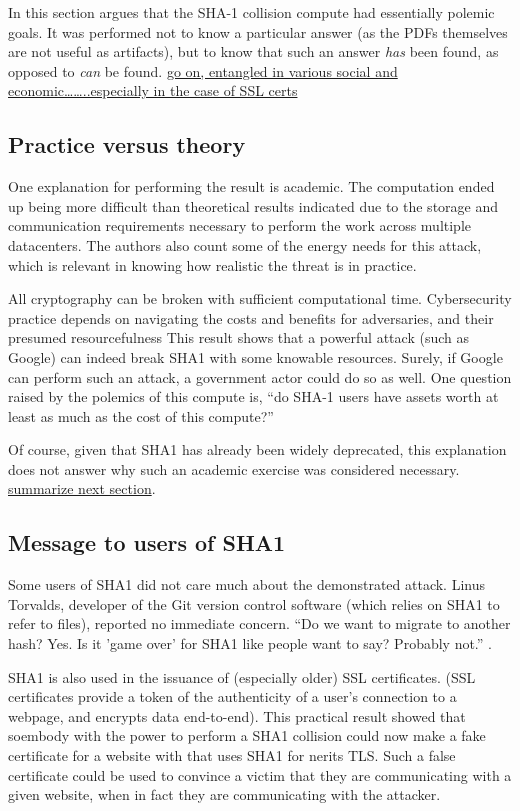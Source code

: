 \documentclass[sigconf]{acmart}
\begin{document}
In this section argues that
the SHA-1 collision compute had essentially polemic goals.
It was performed not to know a particular answer
(as the PDFs themselves are not useful as artifacts), 
but to know that such an answer \emph{has} been found,
as opposed to \emph{can} be found.
\uline{go on, entangled in various social and economic\ldots{}\ldots{}..especially in the case of SSL certs}

\subsection{Practice versus theory}
\label{sec:orgcd4af51}

One explanation for performing the result is academic.
The computation ended up being more difficult than theoretical results indicated due to the storage and communication requirements necessary to perform the work across multiple datacenters. 
The authors also count some of the energy needs for this attack, which is relevant in knowing how realistic the threat is in practice. 

All cryptography can be broken with sufficient computational time.
Cybersecurity practice depends on navigating the costs and benefits for adversaries, and their presumed resourcefulness
This result shows that a powerful attack (such as Google) can indeed break SHA1 with some knowable resources.
Surely, if Google can perform such an attack, a government actor could do so as well.
One question raised by the polemics of this compute is, ``do SHA-1 users have assets worth at least as much as the cost of this compute?''

Of course, given that SHA1 has already been widely deprecated, this explanation does not answer why such an academic exercise was considered necessary.
\uline{summarize next section}.

\subsection{Message to users of SHA1}
\label{sec:org71b6ac8}

Some users of SHA1 did not care much about the demonstrated attack.
Linus Torvalds, developer of the Git version control software (which relies on SHA1 to refer to files), reported no immediate concern.
``Do we want to migrate to another hash? Yes. Is it 'game over' for SHA1 like people want to say? Probably not.'' \cite{Torvalds2017}.

SHA1 is also used in the issuance of (especially older) SSL certificates.
(SSL certificates
provide a token of the authenticity of a user's connection to a webpage,
and encrypts data end-to-end).
This practical result showed that soembody with the power to perform a SHA1 collision could
now make a fake certificate for a website with that uses SHA1 for nerits TLS.
Such a false certificate could
be used to convince a victim that they are communicating with a given website,
when in fact they are communicating with the attacker.
\end{document}
